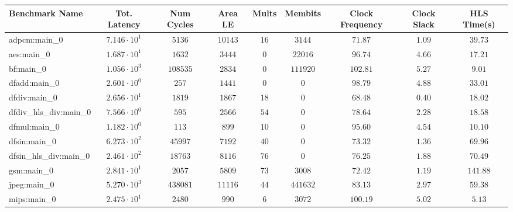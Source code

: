 \begin{tabular}{|l|c|c|c|c|c|c|c|c|}
\hline
Benchmark Name          & Tot. Latency           & Num Cycles & Area LE   & Mults   & Membits    & Clock Frequency & Clock Slack & HLS Time(s) \\
\hline
adpcm:main\_0           & $ 7.146 \cdot 10^{1} $ & $ 5136   $ & $ 10143 $ & $ 16  $ & $ 3144   $ & $ 71.87       $ & $ 1.09    $ & $ 39.73   $ \\
aes:main\_0             & $ 1.687 \cdot 10^{1} $ & $ 1632   $ & $ 3444  $ & $ 0   $ & $ 22016  $ & $ 96.74       $ & $ 4.66    $ & $ 17.21   $ \\
bf:main\_0              & $ 1.056 \cdot 10^{3} $ & $ 108535 $ & $ 2834  $ & $ 0   $ & $ 111920 $ & $ 102.81      $ & $ 5.27    $ & $ 9.01    $ \\
dfadd:main\_0           & $ 2.601 \cdot 10^{0} $ & $ 257    $ & $ 1441  $ & $ 0   $ & $ 0      $ & $ 98.79       $ & $ 4.88    $ & $ 33.01   $ \\
dfdiv:main\_0           & $ 2.656 \cdot 10^{1} $ & $ 1819   $ & $ 1867  $ & $ 18  $ & $ 0      $ & $ 68.48       $ & $ 0.40    $ & $ 18.02   $ \\
dfdiv\_hls\_div:main\_0 & $ 7.566 \cdot 10^{0} $ & $ 595    $ & $ 2566  $ & $ 54  $ & $ 0      $ & $ 78.64       $ & $ 2.28    $ & $ 18.58   $ \\
dfmul:main\_0           & $ 1.182 \cdot 10^{0} $ & $ 113    $ & $ 899   $ & $ 10  $ & $ 0      $ & $ 95.60       $ & $ 4.54    $ & $ 10.10   $ \\
dfsin:main\_0           & $ 6.273 \cdot 10^{2} $ & $ 45997  $ & $ 7192  $ & $ 40  $ & $ 0      $ & $ 73.32       $ & $ 1.36    $ & $ 69.96   $ \\
dfsin\_hls\_div:main\_0 & $ 2.461 \cdot 10^{2} $ & $ 18763  $ & $ 8116  $ & $ 76  $ & $ 0      $ & $ 76.25       $ & $ 1.88    $ & $ 70.49   $ \\
gsm:main\_0             & $ 2.841 \cdot 10^{1} $ & $ 2057   $ & $ 5809  $ & $ 73  $ & $ 3008   $ & $ 72.42       $ & $ 1.19    $ & $ 141.88  $ \\
jpeg:main\_0            & $ 5.270 \cdot 10^{3} $ & $ 438081 $ & $ 11116 $ & $ 44  $ & $ 441632 $ & $ 83.13       $ & $ 2.97    $ & $ 59.38   $ \\
mips:main\_0            & $ 2.475 \cdot 10^{1} $ & $ 2480   $ & $ 990   $ & $ 6   $ & $ 3072   $ & $ 100.19      $ & $ 5.02    $ & $ 5.13    $ \\

\end{tabular}
